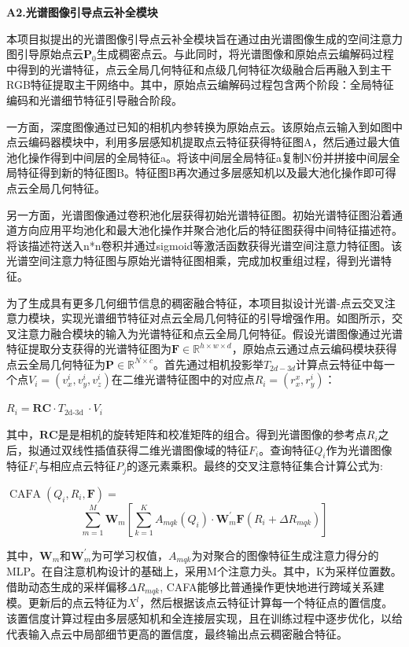 \documentclass[12pt]{article}
\begin{document}
\textbf{A2.光谱图像引导点云补全模块}

本项目拟提出的光谱图像引导点云补全模块旨在通过由光谱图像生成的空间注意力图引导原始点云$\boldsymbol{P}_0$生成稠密点云。与此同时，将光谱图像和原始点云编解码过程中得到的光谱特征，点云全局几何特征和点级几何特征次级融合后再融入到主干RGB特征提取主干网络中。其中，原始点云编解码过程包含两个阶段：全局特征编码和光谱细节特征引导融合阶段。

一方面，深度图像通过已知的相机内参转换为原始点云。该原始点云输入到如图中点云编码器模块中，利用多层感知机提取点云特征获得特征图A，然后通过最大值池化操作得到中间层的全局特征a。将该中间层全局特征a复制N份并拼接中间层全局特征得到新的特征图B。特征图B再次通过多层感知机以及最大池化操作即可得点云全局几何特征。

另一方面，光谱图像通过卷积池化层获得初始光谱特征图。初始光谱特征图沿着通道方向应用平均池化和最大池化操作并聚合池化后的特征图获得中间特征描述符。将该描述符送入n*n卷积并通过sigmoid等激活函数获得光谱空间注意力特征图。该光谱空间注意力特征图与原始光谱特征图相乘，完成加权重组过程，得到光谱特征。

为了生成具有更多几何细节信息的稠密融合特征，本项目拟设计光谱-点云交叉注意力模块，实现光谱细节特征对点云全局几何特征的引导增强作用。如图所示，交叉注意力融合模块的输入为光谱特征和点云全局几何特征。假设光谱图像通过光谱特征提取分支获得的光谱特征图为$\mathbf{F} \in \mathbb{R}^{h \times w \times d}$，原始点云通过点云编码模块获得点云全局几何特征为$\mathbf{P} \in \mathbb{R}^{N \times c}$。首先通过相机投影举$T_{2d-3d}$计算点云特征中每一个点$V_{i}=\left(v_{x}^{i}, v_{y}^{i}, v_{z}^{i}\right)$在二维光谱特征图中的对应点$R_{i}=\left(r_{x}^{x}, r_{y}^{i}\right)$：

$R_{i}=\mathbf{R C} \cdot T_{\text {2d-3d }} \cdot V_{i}$

其中，$\mathbf{R C}$是是相机的旋转矩阵和校准矩阵的组合。得到光谱图像的参考点$R_{i}$之后，拟通过双线性插值获得二维光谱图像域的特征$F_{i}$。查询特征$Q_{i}$作为光谱图像特征$F_{i}$与相应点云特征$P_{j}$的逐元素乘积。最终的交叉注意特征集合计算公式为:

$\operatorname{CAFA}\left(Q_{i}, R_{i}, \mathbf{F}\right)=$
\[\sum_{m=1}^{M} \mathbf{W}_{m}\left[\sum_{k=1}^{K} A_{m q k}\left(Q_{i}\right) \cdot \mathbf{W}_{m}^{\prime} \mathbf{F}\left(R_{i}+\Delta R_{m q k}\right)\right]\]

其中，$\mathbf{W}_{m}$和$\mathbf{W}_{m}^{\prime}$为可学习权值，$A_{mqk}$为对聚合的图像特征生成注意力得分的MLP。在自注意机构设计的基础上，采用M个注意力头。其中，K为采样位置数。借助动态生成的采样偏移$\Delta R_{m q k}$, CAFA能够比普通操作更快地进行跨域关系建模。更新后的点云特征为$X^{l}$，然后根据该点云特征计算每一个特征点的置信度。该置信度计算过程由多层感知机和全连接层实现，且在训练过程中逐步优化，以给代表输入点云中局部细节更高的置信度，最终输出点云稠密融合特征。
\end{document}
